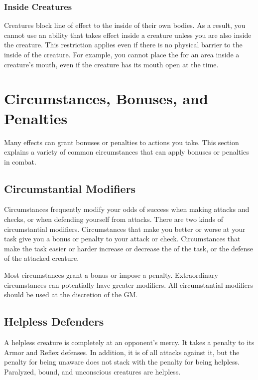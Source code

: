         \subsubsection{Inside Creatures}
            Creatures block line of effect to the inside of their own bodies.
            As a result, you cannot use an ability that takes effect inside a creature unless you are also inside the creature.
            This restriction applies even if there is no physical barrier to the inside of the creature.
            For example, you cannot place the  for an area inside a creature's mouth, even if the creature has its mouth open at the time.

\section{Circumstances, Bonuses, and Penalties}
    Many effects can grant bonuses or penalties to actions you take.
    This section explains a variety of common circumstances that can apply bonuses or penalties in combat.

    \subsection{Circumstantial Modifiers}

        Circumstances frequently modify your odds of success when making attacks and checks, or when defending yourself from attacks.
        There are two kinds of circumstantial modifiers.
        Circumstances that make you better or worse at your task give you a bonus or penalty to your attack or check.
        Circumstances that make the task easier or harder increase or decrease the  of the task, or the defense of the attacked creature.

        Most circumstances grant a  bonus or impose a  penalty.
        Extraordinary circumstances can potentially have greater modifiers.
        All circumstantial modifiers should be used at the discretion of the GM.\@

    \subsection{Helpless Defenders}
        A helpless creature is completely at an opponent's mercy.
        It takes a  penalty to its Armor and Reflex defenses.
        In addition, it is \unaware of all attacks against it, but the penalty for being unaware does not stack with the penalty for being helpless.
        Paralyzed, bound, and unconscious creatures are helpless.

